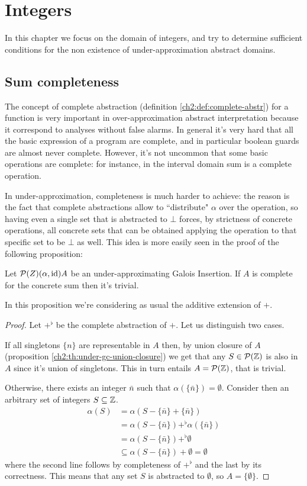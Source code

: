 \chapter{Integers}
In this chapter we focus on the domain of integers, and try to determine sufficient conditions for the non existence of under-approximation abstract domains.

\section{Sum completeness}
The concept of complete abstraction (definition \ref{ch2:def:complete-abstr}) for a function is very important in over-approximation abstract interpretation because it correspond to analyses without false alarms. In general it's very hard that all the basic expression of a program are complete, and in particular boolean guards are almost never complete. However, it's not uncommon that some basic operations are complete: for instance, in the interval domain sum is a complete operation.

In under-approximation, completeness is much harder to achieve: the reason is the fact that complete abstractions allow to ``distribute" $\alpha$ over the operation, so having even a single set that is abstracted to $\bot$ forces, by strictness of concrete operations, all concrete sets that can be obtained applying the operation to that specific set to be $\bot$ as well. This idea is more easily seen in the proof of the following proposition:

\begin{prop}\label{ch3:th:sum-complete-trivial}
	Let $\mathcal{P}(Z) (\alpha, \text{id}) A$ be an under-approximating Galois Insertion. If $A$ is complete for the concrete sum then it's trivial.
\end{prop}
In this proposition we're considering as usual the additive extension of $+$.

\begin{proof}
	Let $+^{\flat}$ be the complete abstraction of $+$.
	Let us distinguish two cases.

	If all singletons $\{ n \}$ are representable in $A$ then, by union closure of $A$ (proposition \ref{ch2:th:under-gc-union-closure}) we get that any $S \in \mathcal{P}(\mathbb{Z})$ is also in $A$ since it's union of singletons. This in turn entails $A = \mathcal{P}(\mathbb{Z})$, that is trivial.

	Otherwise, there exists an integer $\bar{n}$ such that $\alpha(\{ \bar{n} \}) = \emptyset$. Consider then an arbitrary set of integers $S \subseteq \mathbb{Z}$.
	\begin{align*}
		\alpha(S) &= \alpha(S - \{ \bar{n} \} + \{ \bar{n} \} ) \\
		&= \alpha(S - \{ \bar{n} \}) +^{\flat} \alpha(\{ \bar{n} \}) \\
		&= \alpha(S - \{ \bar{n} \}) +^{\flat} \emptyset \\
		&\subseteq \alpha(S - \{ \bar{n} \}) + \emptyset = \emptyset
	\end{align*}
	where the second line follows by completeness of $+^{\flat}$ and the last by its correctness. This means that any set $S$ is abstracted to $\emptyset$, so $A = \{ \emptyset \}$.
\end{proof}

